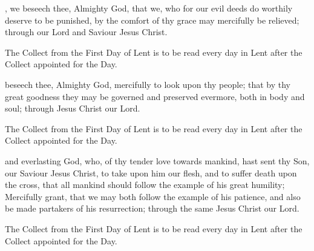 , we beseech thee, Almighty God, that we, who for our evil deeds do worthily deserve to be punished, by the comfort of thy grace may mercifully be relieved; through our Lord and Saviour Jesus Christ.
\begin{secrubric}
The Collect from the First Day of Lent is to be read every day in Lent after the Collect appointed for the Day.
\end{secrubric}

 beseech thee, Almighty God, mercifully to look upon thy people; that by thy great goodness they may be governed and preserved evermore, both in body and soul; through Jesus Christ our Lord.
\begin{secrubric}
The Collect from the First Day of Lent is to be read every day in Lent after the Collect appointed for the Day.
\end{secrubric}

 and everlasting God, who, of thy tender love towards mankind, hast sent thy Son, our Saviour Jesus Christ, to take upon him our flesh, and to suffer death upon the cross, that all mankind should follow the example of his great humility; Mercifully grant, that we may both follow the example of his patience, and also be made partakers of his resurrection; through the same Jesus Christ our Lord.
\begin{secrubric}
The Collect from the First Day of Lent is to be read every day in Lent after the Collect appointed for the Day.
\end{secrubric}

